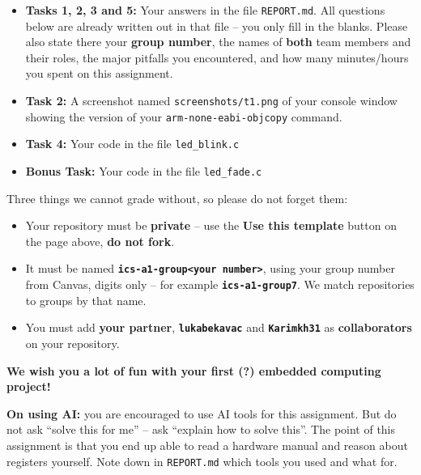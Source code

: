 \documentclass[12pt,a4paper,oneside,openany]{book}
\begin{document}
\begin{itemize}
    \item \textbf{Tasks 1, 2, 3 and 5:} Your answers in the file \texttt{REPORT.md}. All questions below are already written out in that file -- you only fill in the blanks. Please also state there your \textbf{group number}, the names of \textbf{both} team members and their roles, the major pitfalls you encountered, and how many minutes/hours you spent on this assignment.

    \item \textbf{Task 2:} A screenshot named \texttt{screenshots/t1.png} of your console window showing the version of your \texttt{arm-none-eabi-objcopy} command.

    \item \textbf{Task 4:} Your code in the file \texttt{led\_blink.c}

    \item \textbf{Bonus Task:} Your code in the file \texttt{led\_fade.c}
\end{itemize}

\noindent Three things we cannot grade without, so please do not forget them:
\begin{itemize}
    \item Your repository must be \textbf{private} -- use the \textbf{Use this template} button on the page above, \textbf{do not fork}.
    \item It must be named \texttt{\textbf{ics-a1-group<your number>}}, using your group number from Canvas, digits only -- for example \texttt{\textbf{ics-a1-group7}}. We match repositories to groups by that name.
    \item You must add \textbf{your partner}, \texttt{\textbf{lukabekavac}} and \texttt{\textbf{Karimkh31}} as \textbf{collaborators} on your repository.
\end{itemize}

\vspace{10mm}

\begin{center}

\textbf{We wish you a lot of fun with your first (?) embedded computing project!}
\end{center}

\vspace{10mm}

\textbf{On using AI:} you are encouraged to use AI tools for this assignment. But do not ask ``solve this for me'' -- ask ``explain how to solve this''. The point of this assignment is that you end up able to read a hardware manual and reason about registers yourself. Note down in \texttt{REPORT.md} which tools you used and what for.
\end{document}
